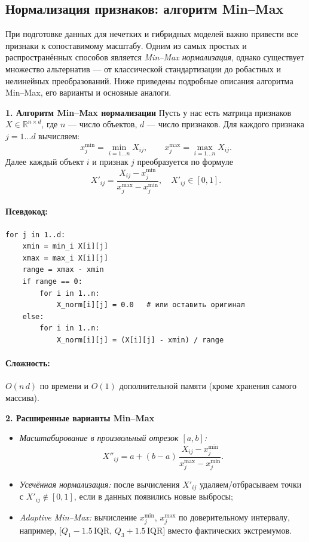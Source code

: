\subsection{Нормализация признаков: алгоритм Min–Max}

При подготовке данных для нечетких и гибридных моделей важно привести все признаки к сопоставимому масштабу. Одним из самых простых и распространённых способов является \emph{Min–Max нормализация}, однако существует множество альтернатив — от классической стандартизации до робастных и нелинейных преобразований. Ниже приведены подробные описания алгоритма Min–Max, его варианты и основные аналоги.

\medskip
\noindent\textbf{1. Алгоритм Min–Max нормализации}  
Пусть у нас есть матрица признаков \(X \in \mathbb{R}^{n\times d}\), где \(n\) — число объектов, \(d\) — число признаков. Для каждого признака \(j = 1\ldots d\) вычисляем:
\[
  x_j^{\min} = \min_{i=1\ldots n} X_{i j},\qquad
  x_j^{\max} = \max_{i=1\ldots n} X_{i j}.
\]
Далее каждый объект \(i\) и признак \(j\) преобразуется по формуле
\[
  X'_{i j}
  = \frac{X_{i j} - x_j^{\min}}{x_j^{\max} - x_j^{\min}},
  \quad X'_{i j} \in [0,1].
\]
\paragraph{Псевдокод:}
\begin{verbatim}
for j in 1..d:
    xmin = min_i X[i][j]
    xmax = max_i X[i][j]
    range = xmax - xmin
    if range == 0:
        for i in 1..n:
            X_norm[i][j] = 0.0   # или оставить оригинал
    else:
        for i in 1..n:
            X_norm[i][j] = (X[i][j] - xmin) / range
\end{verbatim}
\paragraph{Сложность:} \(O(n\,d)\) по времени и \(O(1)\) дополнительной памяти (кроме хранения самого массива).

\medskip
\noindent\textbf{2. Расширенные варианты Min–Max}  
\begin{itemize}
  \item \emph{Масштабирование в произвольный отрезок \([a,b]\):}
    \[
      X''_{ij} = a + (b - a)\,\frac{X_{ij} - x_j^{\min}}{x_j^{\max} - x_j^{\min}}.
    \]
  \item \emph{Усечённая нормализация:} после вычисления \(X'_{ij}\) удаляем/отбрасываем точки с \(X'_{ij}\notin[0,1]\), если в данных появились новые выбросы;
  \item \emph{Adaptive Min–Max:} вычисление \(x_j^{\min}\), \(x_j^{\max}\) по доверительному интервалу, например, \(\bigl[Q_1 - 1.5\,\mathrm{IQR},\,Q_3 + 1.5\,\mathrm{IQR}\bigr]\) вместо фактических экстремумов.
\end{itemize}

